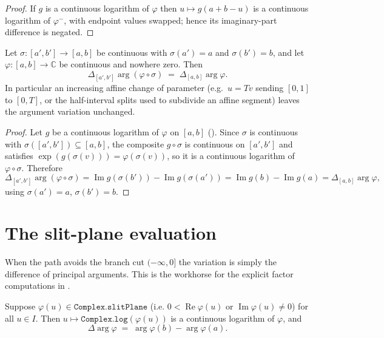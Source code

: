 \begin{proof}
\leanok
{}
If $g$ is a continuous logarithm of $\varphi$ then $u\mapsto g(a+b-u)$ is a
continuous logarithm of $\varphi^-$, with endpoint values swapped; hence its
imaginary-part difference is negated.
\end{proof}

\begin{lemma}
\label{lem:av_reparam}
\leanok
{}
Let $\sigma:[a',b']\to[a,b]$ be continuous with $\sigma(a')=a$ and $\sigma(b')=b$, and
let $\varphi:[a,b]\to\mathbb{C}$ be continuous and nowhere zero. Then
\[
  \Delta_{[a',b']}\arg(\varphi\circ\sigma) \;=\; \Delta_{[a,b]}\arg\varphi .
\]
In particular an increasing affine change of parameter (e.g.\ $u=Tv$ sending $[0,1]$ to
$[0,T]$, or the half-interval splits used to subdivide an affine segment) leaves the
argument variation unchanged.
\end{lemma}

\begin{proof}
\leanok
{}
Let $g$ be a continuous logarithm of $\varphi$ on $[a,b]$ (). Since
$\sigma$ is continuous with $\sigma([a',b'])\subseteq[a,b]$, the composite $g\circ\sigma$
is continuous on $[a',b']$ and satisfies $\exp(g(\sigma(v)))=\varphi(\sigma(v))$, so it is
a continuous logarithm of $\varphi\circ\sigma$. Therefore
\[
  \Delta_{[a',b']}\arg(\varphi\circ\sigma)
   = \operatorname{Im} g(\sigma(b')) - \operatorname{Im} g(\sigma(a'))
   = \operatorname{Im} g(b) - \operatorname{Im} g(a)
   = \Delta_{[a,b]}\arg\varphi ,
\]
using $\sigma(a')=a$, $\sigma(b')=b$.
\end{proof}

\section{The slit-plane evaluation}
\label{sec:av_slitPlane}

When the path avoids the branch cut $(-\infty,0]$ the variation is simply the
difference of principal arguments. This is the workhorse for the explicit factor
computations in .

\begin{lemma}
\label{lem:av_slitPlane}
\leanok
{}
Suppose $\varphi(u)\in\texttt{Complex.slitPlane}$ (i.e.
$0<\operatorname{Re}\varphi(u)$ or $\operatorname{Im}\varphi(u)\neq0$) for all
$u\in I$. Then $u\mapsto\texttt{Complex.log}(\varphi(u))$ is a continuous logarithm
of $\varphi$, and
\[
  \Delta\arg\varphi \;=\; \arg\varphi(b) - \arg\varphi(a).
\]
\end{lemma}

